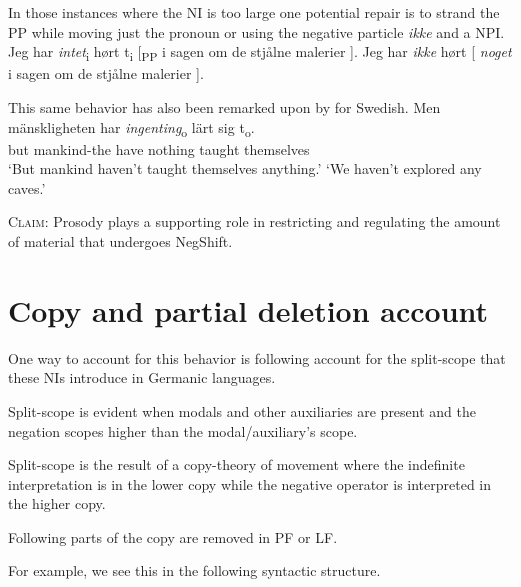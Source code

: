 \documentclass[12pt, letterpaper]{article}
\begin{document}
\ex In those instances where the NI is too large one potential repair is to strand the PP while moving just the pronoun or using the negative particle \textit{ikke} and a NPI.
	\ea Jeg har \textit{intet}\textsubscript{i} hørt t\textsubscript{i} [\textsubscript{PP} i sagen om de stjålne malerier ].
	\ex Jeg har \textit{ikke} hørt [ \textit{noget} i sagen om de stjålne malerier ].
	\z 
 
\ex This same behavior has also been remarked upon by \citet{penkaNegativeIndefinites2011} for Swedish.
	\ea 
	\gll Men mänskligheten har \textit{ingenting}\textsubscript{o} lärt sig t\textsubscript{o}.\\
	but mankind-the have nothing taught themselves\\
	\glt `But mankind haven't taught themselves anything.'
	\glt `We haven't explored any caves.'
	\z 
\z 
\begin{tcolorbox}[width=\linewidth]
\textsc{Claim:} Prosody plays a supporting role in restricting and regulating the amount of material that undergoes NegShift.
\end{tcolorbox}
\section{Copy and partial deletion account} \label{sec:ZEIJLSTRA}

\ea One way to account for this behavior is following \cite{zeijlstraSyntacticallyComplexStatus2011} account for the split-scope that these NIs introduce in Germanic languages.

\ex Split-scope is evident when modals and other auxiliaries are present and the negation scopes higher than the modal/auxiliary's scope.

\ex Split-scope is the result of a copy-theory of movement where the indefinite interpretation is in the lower copy while the negative operator is interpreted in the higher copy.

\ex Following \citet{fanselowRemarksEconomyPronunciation2001,fanselowDistributedDeletion2002} parts of the copy are removed in PF or LF.

\ex For example, we see this in the following syntactic structure.\\
	
\end{document}
